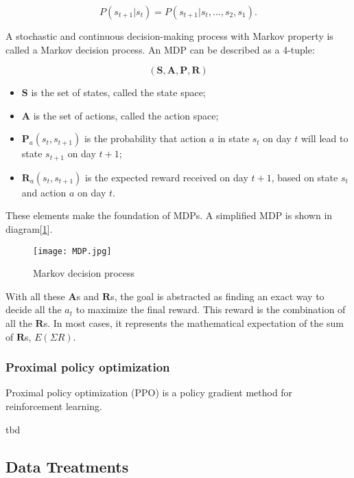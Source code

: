 \documentclass{mcmthesis}
\begin{document}
\begin{equation}
  P(s_{t+1}\vert s_t) = P(s_{t+1}\vert s_t,...,s_2,s_1).
\end{equation}

A stochastic and continuous decision-making process with Markov property
is called a Markov decision process.
An MDP can be described as a 4-tuple:

\begin{equation}
(\pmb{S},\pmb{A},\pmb{P},\pmb{R})
\end{equation}

\begin{itemize}
  \item $\pmb{S}$ is the set of states, called the state space;
  \item $\pmb{A}$ is the set of actions, called the action space;
  \item $\pmb{P}_a(s_t, s_{t+1})$ is the probability that action $a$ in state $s_t$ on day $t$ will lead to state $s_{t+1}$ on day $t+1$;
  \item $\pmb{R}_a(s_t, s_{t+1})$ is the expected reward received on day $t+1$, based on state $s_t$ and action $a$ on day $t$.
\end{itemize}

These elements make the foundation of MDPs.
A simplified MDP is shown in diagram[\ref{MDP}].

\begin{figure}[h]
  \small
  \centering
  \texttt{[image: MDP.jpg]}
  \caption{Markov decision process} \label{MDP}
\end{figure}

With all these $\pmb{A}$s and $\pmb{R}$s,
the goal is abstracted as finding an exact way to decide all the $a_t$
to maximize the final reward.
This reward is the combination of all the $\pmb{R}$s.
In most cases, it represents the mathematical expectation of the sum of $\pmb{R}$s,
$E(\Sigma R)$.

\subsubsection{Proximal policy optimization}

Proximal policy optimization (PPO) is a policy gradient method for reinforcement learning.

tbd

\subsection{Data Treatments}
\end{document}
